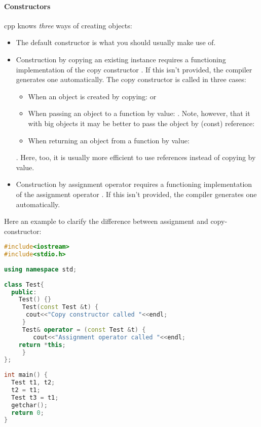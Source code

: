 \paragraph{Constructors} cpp knows \emph{three} ways of creating objects: 
\begin{itemize}
    \item The default constructor  is what you should usually make use of. 
 
    \item Construction by copying an existing instance  requires a functioning implementation of the copy constructor . If this isn't provided, the compiler generates one automatically. The copy constructor is called in three cases: 
    	\begin{itemize}
    		\item When an object is created by copying:  or 
    		\item When passing an object to a function by value:  . Note, however, that it with big objects it may be better to pass the object by (const) reference: 
    		\item When returning an object from a function by value: 
    	\end{itemize} . Here, too, it is usually more efficient to use references instead of copying by value. 
    
    \item Construction by assignment operator  requires a functioning implementation of the assignment operator . If this isn't provided, the compiler generates one automatically. 
\end{itemize}

Here an example to clarify the difference between assignment and copy-constructor:

\begin{lstlisting}[language=c++]
#include<iostream>
#include<stdio.h>
 
using namespace std;
 
class Test{
  public:
    Test() {}
     Test(const Test &t) {
      cout<<"Copy constructor called "<<endl;
     }
     Test& operator = (const Test &t) {
        cout<<"Assignment operator called "<<endl;
	return *this;
     }
};
 
int main() {
  Test t1, t2;
  t2 = t1;
  Test t3 = t1;
  getchar();
  return 0;
}
\end{lstlisting}

